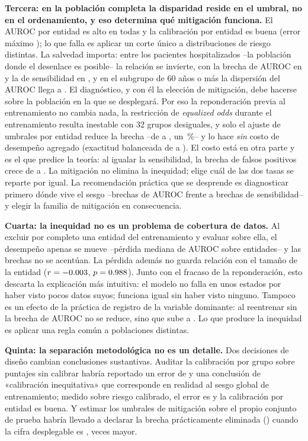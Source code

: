 \textbf{Tercera: en la población completa la disparidad reside en el umbral, no
en el ordenamiento, y eso determina qué mitigación funciona.} El AUROC por entidad
es alto en todas y la calibración por entidad es buena (error máximo
\errCalEntidad); lo que falla es aplicar un corte único a distribuciones de riesgo
distintas. La salvedad importa: entre los pacientes hospitalizados --la población
donde el desenlace es posible-- la relación se invierte, con la brecha de AUROC en
\hospGapAUROC{} y la de sensibilidad en \hospGapTPR, y en el subgrupo de 60 años o
más la dispersión del AUROC llega a \sesentaRango. El diagnóstico, y con él la
elección de mitigación, debe hacerse sobre la población en la que se desplegará. Por eso la
reponderación previa al entrenamiento no cambia nada, la restricción de
\emph{equalized odds} durante el entrenamiento resulta inestable con 32 grupos
desiguales, y solo el ajuste de umbrales por entidad reduce la brecha --de
\gapBase{} a \gapPost, un \reduccionPost\,\%-- y lo hace \emph{sin} costo de
desempeño agregado (exactitud balanceada de \accBase{} a \accPost). El costo está
en otra parte y es el que predice la teoría: al igualar la sensibilidad, la brecha
de falsos positivos crece de \postGapFPRbase{} a \postGapFPR. La mitigación no
elimina la inequidad; elige cuál de las dos tasas se reparte por igual. La
recomendación práctica que se desprende es diagnosticar primero dónde vive el
sesgo --brechas de AUROC frente a brechas de sensibilidad-- y elegir la familia de
mitigación en consecuencia.

\textbf{Cuarta: la inequidad no es un problema de cobertura de datos.} Al excluir
por completo una entidad del entrenamiento y evaluar sobre ella, el desempeño
apenas se mueve --pérdida mediana de AUROC \loeoMediana{} sobre \loeoNent{}
entidades-- y las brechas no se acentúan. La pérdida además no guarda relación con
el tamaño de la entidad ($r=-0.003$, $p=0.988$). Junto con el
fracaso de la reponderación, esto descarta la explicación más intuitiva: el modelo
no falla en unos estados por haber visto pocos datos suyos; funciona igual sin
haber visto ninguno. Tampoco es un efecto de la práctica de registro de la
variable dominante: al reentrenar sin \texttt{\impPrimeraVar} la brecha de AUROC
no se reduce, sino que sube a \sinNeuGapAUROC. Lo que produce la inequidad es
aplicar una regla común a poblaciones distintas.

\textbf{Quinta: la separación metodológica no es un detalle.} Dos decisiones de
diseño cambian conclusiones sustantivas. Auditar la calibración por grupo sobre
puntajes sin calibrar habría reportado un error de \errCalCrudo{} y una conclusión de
«calibración inequitativa» que corresponde en realidad al sesgo global de
entrenamiento; medido sobre riesgo calibrado, el error es \errCalEntidad{} y la
calibración por entidad es buena. Y estimar los umbrales de mitigación sobre el
propio conjunto de prueba habría llevado a declarar la brecha prácticamente
eliminada (\gapPostOpt) cuando la cifra desplegable es \gapPost, \factorOptimismo{} veces
mayor.

